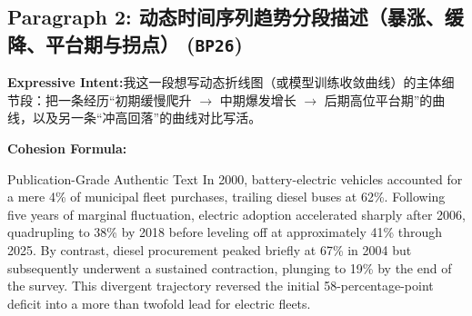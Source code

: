 \subsection*{Paragraph 2: 动态时间序列趋势分段描述（暴涨、缓降、平台期与拐点） (\texttt{BP26})}
\noindent\textbf{Expressive Intent:}\enspace 我这一段想写动态折线图（或模型训练收敛曲线）的主体细节段：把一条经历“初期缓慢爬升 $\to$ 中期爆发增长 $\to$ 后期高位平台期”的曲线，以及另一条“冲高回落”的曲线对比写活。\par
\noindent\textbf{Cohesion Formula:}\par\vspace{4pt}
\begin{ExampleBox}{Publication-Grade Authentic Text}
In 2000, battery-electric vehicles accounted for a mere 4\% of municipal fleet purchases, trailing diesel buses at 62\%. Following five years of marginal fluctuation, electric adoption accelerated sharply after 2006, quadrupling to 38\% by 2018 before leveling off at approximately 41\% through 2025. By contrast, diesel procurement peaked briefly at 67\% in 2004 but subsequently underwent a sustained contraction, plunging to 19\% by the end of the survey. This divergent trajectory reversed the initial 58-percentage-point deficit into a more than twofold lead for electric fleets.
\end{ExampleBox}

